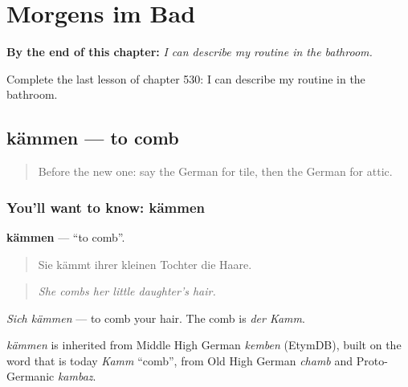 
\chapter{Morgens im Bad}
\label{ch:ge-morgens-im-bad}

\begin{chapteropening}
\textbf{By the end of this chapter:} \emph{I can describe my routine in the bathroom.}

Complete the last lesson of chapter 530: I can describe my routine in the bathroom.
\end{chapteropening}

\section[kämmen]{kämmen — to comb}

\label{lesson:GE-C530-kaemmen}



\begin{quote}
Before the new one: say the German for tile, then the German for attic.
\end{quote}

\subsection*{You'll want to know: kämmen}
\textbf{kämmen} — \textquotedblleft{}to comb\textquotedblright{}.

\begin{quote}
Sie kämmt ihrer kleinen Tochter die Haare.
\end{quote}

\begin{quote}
\emph{She combs her little daughter's hair.}
\end{quote}

\emph{Sich kämmen} — to comb your hair. The comb is \emph{der Kamm}.

\begin{cousinweb}
\emph{kämmen} is inherited from Middle High German \emph{kemben} (EtymDB), built on the word that is today \emph{Kamm} \textquotedblleft{}comb\textquotedblright{}, from Old High German \emph{chamb} and Proto-Germanic \emph{kambaz}.
\end{cousinweb}

